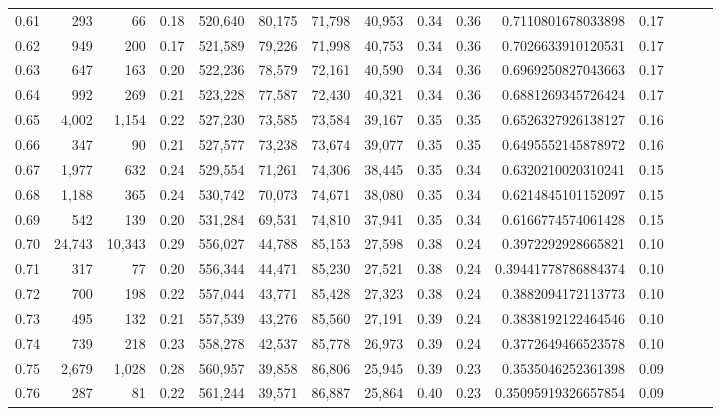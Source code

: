 \begin{tabular}{rrrrrrrrrrrrrrr}
0.61 &     293 &      66 &  0.18 &  520,640 &   80,175 &   71,798 &   40,953 &  0.34 &  0.36 &    0.7110801678033898 &      0.17 \\
0.62 &     949 &     200 &  0.17 &  521,589 &   79,226 &   71,998 &   40,753 &  0.34 &  0.36 &    0.7026633910120531 &      0.17 \\
0.63 &     647 &     163 &  0.20 &  522,236 &   78,579 &   72,161 &   40,590 &  0.34 &  0.36 &    0.6969250827043663 &      0.17 \\
0.64 &     992 &     269 &  0.21 &  523,228 &   77,587 &   72,430 &   40,321 &  0.34 &  0.36 &    0.6881269345726424 &      0.17 \\
0.65 &   4,002 &   1,154 &  0.22 &  527,230 &   73,585 &   73,584 &   39,167 &  0.35 &  0.35 &    0.6526327926138127 &      0.16 \\
0.66 &     347 &      90 &  0.21 &  527,577 &   73,238 &   73,674 &   39,077 &  0.35 &  0.35 &    0.6495552145878972 &      0.16 \\
0.67 &   1,977 &     632 &  0.24 &  529,554 &   71,261 &   74,306 &   38,445 &  0.35 &  0.34 &    0.6320210020310241 &      0.15 \\
0.68 &   1,188 &     365 &  0.24 &  530,742 &   70,073 &   74,671 &   38,080 &  0.35 &  0.34 &    0.6214845101152097 &      0.15 \\
0.69 &     542 &     139 &  0.20 &  531,284 &   69,531 &   74,810 &   37,941 &  0.35 &  0.34 &    0.6166774574061428 &      0.15 \\
0.70 &  24,743 &  10,343 &  0.29 &  556,027 &   44,788 &   85,153 &   27,598 &  0.38 &  0.24 &    0.3972292928665821 &      0.10 \\
0.71 &     317 &      77 &  0.20 &  556,344 &   44,471 &   85,230 &   27,521 &  0.38 &  0.24 &   0.39441778786884374 &      0.10 \\
0.72 &     700 &     198 &  0.22 &  557,044 &   43,771 &   85,428 &   27,323 &  0.38 &  0.24 &    0.3882094172113773 &      0.10 \\
0.73 &     495 &     132 &  0.21 &  557,539 &   43,276 &   85,560 &   27,191 &  0.39 &  0.24 &    0.3838192122464546 &      0.10 \\
0.74 &     739 &     218 &  0.23 &  558,278 &   42,537 &   85,778 &   26,973 &  0.39 &  0.24 &    0.3772649466523578 &      0.10 \\
0.75 &   2,679 &   1,028 &  0.28 &  560,957 &   39,858 &   86,806 &   25,945 &  0.39 &  0.23 &    0.3535046252361398 &      0.09 \\
0.76 &     287 &      81 &  0.22 &  561,244 &   39,571 &   86,887 &   25,864 &  0.40 &  0.23 &   0.35095919326657854 &      0.09 \\

\end{tabular}
